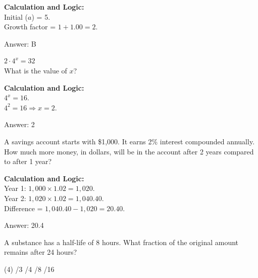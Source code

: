 \documentclass[11pt,paper=a4,answers]{exam}
\begin{document}
\begin{questions}
\begin{solution}
\textbf{Calculation and Logic:} \\
Initial ($a$) = 5. \\
Growth factor = $1 + 1.00 = 2$.

\vspace{25pt}

Answer: \colorbox{yellow!100}{B}
\end{solution}

\vspace{40pt}

\question
$2 \cdot 4^x = 32$ \\
What is the value of $x$?

\begin{solution}
\textbf{Calculation and Logic:} \\
$4^x = 16$. \\
$4^2 = 16 \Rightarrow x = 2$.

\vspace{25pt}

Answer: \colorbox{yellow!100}{2}
\end{solution}

\vspace{40pt}

\question
A savings account starts with \$1,000. It earns 2\% interest compounded annually. How much more money, in dollars, will be in the account after 2 years compared to after 1 year?

\begin{solution}
\textbf{Calculation and Logic:} \\
Year 1: $1,000 \times 1.02 = 1,020$. \\
Year 2: $1,020 \times 1.02 = 1,040.40$. \\
Difference = $1,040.40 - 1,020 = 20.40$.

\vspace{25pt}

Answer: \colorbox{yellow!100}{20.4}
\end{solution}

\vspace{40pt}

\question
A substance has a half-life of 8 hours. What fraction of the original amount remains after 24 hours?
\begin{tasks}(4)
    /3
    /4
    /8
    /16
\end{tasks}


\end{questions}
\end{document}
